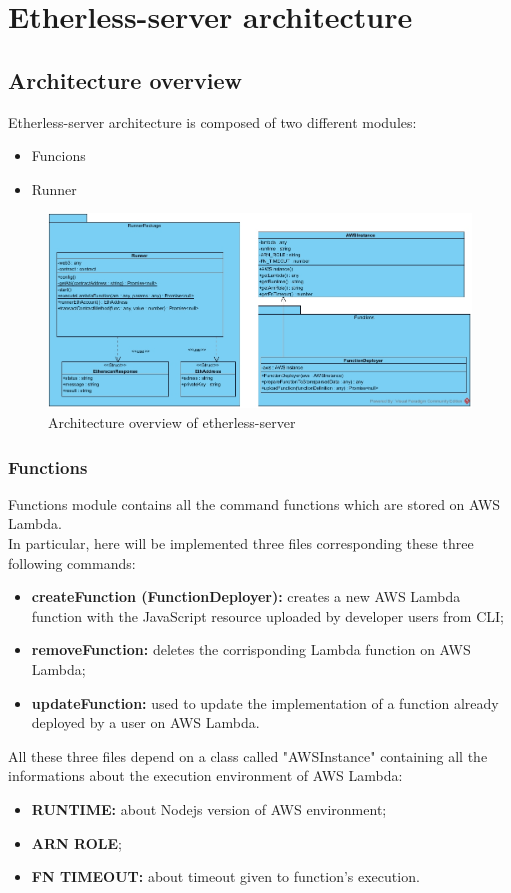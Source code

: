 \section{Etherless-server architecture}
\subsection{Architecture overview}
Etherless-server architecture is composed of two different modules:
\begin{itemize}
	\item Funcions
	\item Runner
\end{itemize}
\begin{figure}[!h]
\centering
	\includegraphics[width=\textwidth]{res/img/etherlessServer.jpg}
	\caption{Architecture overview of etherless-server}
\end{figure}
\subsubsection{Functions}
Functions module contains all the command functions which are stored on AWS Lambda. \\
In particular, here will be implemented three files corresponding these three following commands:
\begin{itemize}
	\item \textbf{createFunction (FunctionDeployer):} creates a new AWS Lambda function with the JavaScript resource uploaded by developer users from CLI\glo;
	\item \textbf{removeFunction:} deletes the corrisponding Lambda function on AWS Lambda;
	\item \textbf{updateFunction:} used to update the implementation of a function already deployed by a user on AWS Lambda.
\end{itemize}
All these three files depend on a class called "AWSInstance" containing all the informations about the execution environment of AWS Lambda:
\begin{itemize}
	\item \textbf{RUNTIME:} about Nodejs version of AWS environment;
	\item \textbf{ARN ROLE};
	\item \textbf{FN TIMEOUT:} about timeout given to function's execution.
\end{itemize}

